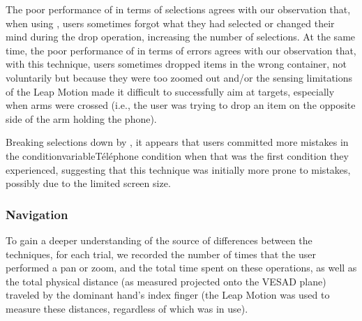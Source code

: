The poor performance of  in terms of selections agrees with our observation that, when using , users sometimes forgot what they had selected or changed their mind during the drop operation, increasing the number of selections. At the same time, the poor performance of  in terms of errors agrees with our observation that, with this technique, users sometimes dropped items in the wrong container, not voluntarily but because they were too zoomed out and/or the sensing limitations of the Leap Motion made it difficult to successfully aim at targets, especially when arms were crossed (i.e., the user was trying to drop an item on the opposite side of the arm holding the phone).

Breaking selections down by  , it appears that users committed more mistakes in the conditionvariable{Téléphone} condition when that was the first condition they experienced, suggesting that this technique was initially more prone to mistakes, possibly due to the limited screen size.


\subsubsection{Navigation}
\label{subsubsec:experiment_results_navigation}
To gain a deeper understanding of the source of differences between
the techniques, for each trial, we recorded the number of times that the user performed a pan or zoom, and the total time spent on these operations,
as well as the total physical distance (as measured projected onto the VESAD plane) traveled by the dominant hand's index finger (the Leap Motion was used to measure these distances, regardless of which  was in use).

